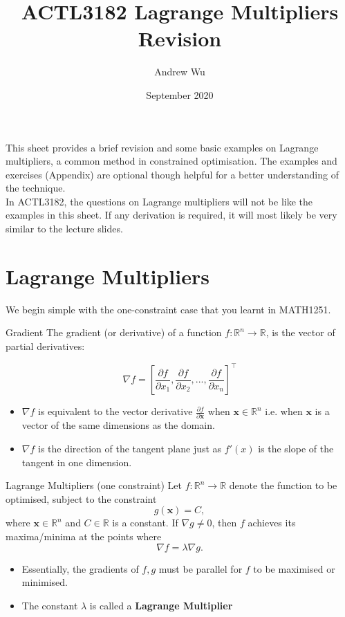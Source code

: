 \documentclass[11pt]{article}
\title{\textbf{ACTL3182 Lagrange Multipliers Revision}}
\author{Andrew Wu}
\date{September 2020}
\newcommand{\R}{\mathbb{R}}
\newcommand{\vx}{\bm{x}}
\begin{document}
	\maketitle
	\noindent This sheet provides a brief revision and some basic examples on Lagrange multipliers, a common method in constrained optimisation. The examples and exercises (Appendix) are optional though helpful for a better understanding of the technique.\\ In ACTL3182, the questions on Lagrange multipliers will not be like the examples in this sheet. If any derivation is required, it will most likely be very similar to the lecture slides.
	
	\section{Lagrange Multipliers}
	We begin simple with the one-constraint case that you learnt in MATH1251.
	\begin{definition}{Gradient}{}
		The gradient (or derivative) of a function \( f:\R^{n}\to\R \), is the vector of partial derivatives:

		\[	\nabla f =		\left[\frac{\partial f}{\partial x_1}  , \frac{\partial f}{\partial x_2} , ... , \frac{\partial f}{\partial x_n}\right]^{\top}				
			\]
		\tcblower
		\begin{itemize}
			\item \( \nabla f \) is equivalent to the vector derivative \( \frac{\partial f}{\partial \bm{x}} \) when \( \vx\in\R^n \) i.e. when \( \vx \) is a vector of the same dimensions as the domain.
			\item \( \nabla f \) is the direction of the tangent plane just as \( f'(x) \) is the slope of the tangent in one dimension.
		\end{itemize}
	\end{definition}
	\bigskip
	\noindent 
	\begin{theorem}{Lagrange Multipliers (one constraint)}{}
		Let \( f:\R^n \to\R \) denote the function to be optimised, subject to the constraint 
		\[	g(\vx) = C, \]
		where \( \vx\in\R^n \)	and \( C\in\R \) is a constant. If \( \nabla g \neq 0 \), then \( f \) achieves its maxima/minima at the points where 
		\[	\nabla f = \lambda \nabla g.\]
		\tcblower
		\begin{itemize}
			\item Essentially, the gradients of \( f,g \) must be parallel for \( f \) to be maximised or minimised.
			\item The constant \( \lambda \) is called a \textbf{Lagrange Multiplier}
		\end{itemize} 
	\end{theorem}
\end{document}
